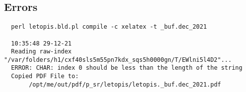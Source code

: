 
 
 
 
 

\subsection{Errors}
\label{sec:build.err}

\begin{Verbatim}
  perl letopis.bld.pl compile -c xelatex -t _buf.dec_2021
  
  10:35:48 29-12-21
  Reading raw-index "/var/folders/h1/cxf40sls5m55pn7kdx_sqs5h0000gn/T/EWlni5l4D2"...
  ERROR: CHAR: index 0 should be less than the length of the string
  Copied PDF File to:
       /opt/me/out/pdf/p_sr/letopis/letopis._buf.dec_2021.pdf
\end{Verbatim}
